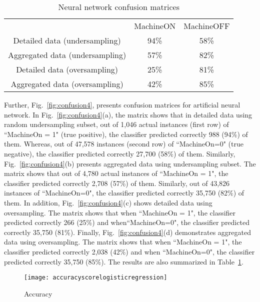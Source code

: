 \documentclass[runningheads]{llncs}
\begin{document}
 \begin{table}[ht]
\caption{Neural network confusion matrices}
\label{example5}
\centering
\begin{tabular}{ccc}
\hline\noalign{\smallskip}
 & MachineON & MachineOFF\\

\noalign{\smallskip}
\hline
\noalign{\smallskip}
Detailed data (undersampling)  &        94\% &58\%  \\
Aggregated data (undersampling)   &         57\% & 82\% \\
Detailed data (oversampling)        &        25\% & 81\%   \\
Aggregated data (oversampling) &        42\% & 85\%   \\
\hline
\end{tabular}
\end{table}

Further, Fig.~\ref{fig:confusion4}, presents confusion matrices for artificial neural network. In  Fig.~\ref{fig:confusion4}(a), the matrix shows that in detailed data using random undersampling subset, out of 1,046 actual instances (first row) of ``MachineOn = 1" (true positive), the classifier predicted correctly 988 (94\%) of them. Whereas, out of 47,578 instances (second row) of ``MachineOn=0" (true negative), the classifier predicted correctly 27,700 (58\%) of them. Similarly, Fig.~\ref{fig:confusion4}(b) presents aggregated data using undersampling subset. The matrix shows that out of 4,780 actual instances of ``MachineOn = 1", the classifier predicted correctly 2,708 (57\%) of them. Similarly, out of 43,826 instances of ``MachineOn=0", the classifier predicted correctly 35,750 (82\%) of them. In addition, Fig.~\ref{fig:confusion4}(c) shows detailed data using oversampling. The matrix shows that when ``MachineOn = 1", the classifier predicted correctly 266 (25\%) and when``MachineOn=0", the classifier predicted correctly 35,750 (81\%). Finally,  Fig.~\ref{fig:confusion4}(d) demonstrates aggregated data using oversampling. The matrix shows that when ``MachineOn = 1", the classifier predicted correctly 2,038 (42\%) and when ``MachineOn=0", the classifier predicted correctly 35,750 (85\%). The results are also summarized in Table~\ref{example5}.



\begin{figure}
\centering
\texttt{[image: accuracyscorelogisticregression]} 
\caption{Accuracy}
\label{fig:confusion5}
\end{figure}
\end{document}
